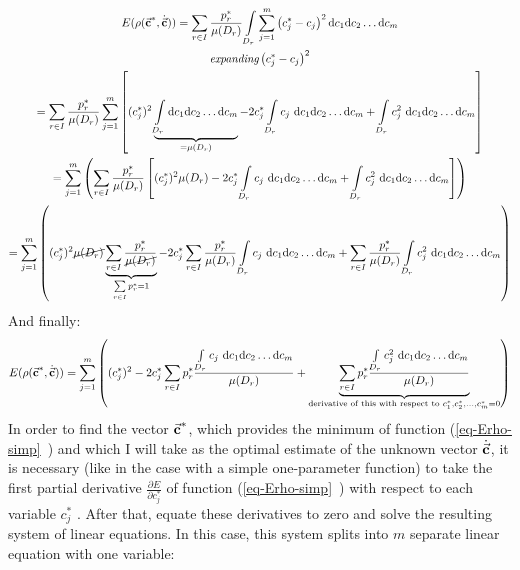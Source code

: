 \begin{gather}
\nonumber
E(\rho(\vec{\textbf{c}}^{*},\dot{\vec{\textbf{c}}}))=\sum\limits_{r \in I} \frac{p_{r}^{*}}{\mu(D_{r})} \int\limits_{D_{r}}\sum\limits_{j=1}^{m} \left( c_{j}^{*}-c_{j} \right)^{2}\mathrm{d}c_{1}\mathrm{d}c_{2}\dots \mathrm{d}c_{m}\\
\nonumber
\textit{expanding} \left( c_{j}^{*}-c_{j} \right)^{2} \\
\nonumber
=\sum\limits_{r \in I} \frac{p_{r}^{*}}{\mu(D_{r})} \sum\limits_{j=1}^{m} \left[ (c_{j}^{*})^{2} \underbrace{\int\limits_{D_{r}} \mathrm{d}c_{1}\mathrm{d}c_{2}\dots \mathrm{d}c_{m}}_{{=\mu(D_{r})}} - 2c_{j}^{*} \int\limits_{D_{r}} c_{j} \  \mathrm{d}c_{1}\mathrm{d}c_{2}\dots \mathrm{d}c_{m} + \int\limits_{D_{r}} c_{j}^{2} \  \mathrm{d}c_{1}\mathrm{d}c_{2}\dots \mathrm{d}c_{m}\right]\\
\nonumber
=\sum\limits_{j=1}^{m} \left( \sum\limits_{r \in I} \frac{p_{r}^{*}}{\mu(D_{r})} \left[ (c_{j}^{*})^{2} \mu(D_{r})-2c_{j}^{*} \int\limits_{D_{r}} c_{j} \  \mathrm{d}c_{1}\mathrm{d}c_{2}\dots \mathrm{d}c_{m} + \int\limits_{D_{r}} c_{j}^{2} \  \mathrm{d}c_{1}\mathrm{d}c_{2}\dots \mathrm{d}c_{m} \right] \right)\\ 
=\sum\limits_{j=1}^{m} \left( (c_{j}^{*})^{2} \cancel{\mu(D_{r})} \underbrace{\sum\limits_{r \in I} \frac{p_{r}^{*}}{\cancel{\mu(D_{r})}}}_{\sum\limits_{r \in I}p_{r}^{*} = 1} - 2c_{j}^{*} \sum\limits_{r \in I}\frac{p_{r}^{*}}{\mu(D_{r})} \int\limits_{D_{r}} c_{j} \  \mathrm{d}c_{1}\mathrm{d}c_{2}\dots \mathrm{d}c_{m} + \sum\limits_{r \in I}\frac{p_{r}^{*}}{\mu(D_{r})} \int\limits_{D_{r}} c_{j}^{2} \  \mathrm{d}c_{1}\mathrm{d}c_{2}\dots \mathrm{d}c_{m} \right)
\end{gather}
And finally:
\begin{equation}
E(\rho(\vec{\textbf{c}}^{*},\dot{\vec{\textbf{c}}}))= \sum\limits_{j=1}^{m} \left( (c_{j}^{*})^{2} - 2c_{j}^{*} \sum\limits_{r \in I} p_{r}^{*} \frac{\int\limits_{D_{r}} c_{j} \  \mathrm{d}c_{1}\mathrm{d}c_{2}\dots \mathrm{d}c_{m}}{\mu(D_{r})} + \underbrace{\sum\limits_{r \in I} p_{r}^{*} \frac{\int\limits_{D_{r}} c_{j}^{2} \  \mathrm{d}c_{1}\mathrm{d}c_{2}\dots \mathrm{d}c_{m}}{\mu(D_{r})}}_{\text{derivative of this with respect to } c_{1}^{*}, c_{2}^{*},\dots,c_{m}^{*} = 0} \right) \label{eq-Erho-simp}
\end{equation}
In order to find the vector $\vec{\textbf{c}}^{*}$, which provides the minimum of function (\vref{eq-Erho-simp}~) and which I will take as the optimal estimate of the unknown vector $\dot{\vec{\textbf{c}}}$, it is necessary (like in the case with a simple one-parameter function) to take the first partial derivative $\frac{\partial E}{\partial c_{j}^{*}}$ of function (\vref{eq-Erho-simp}~) with respect to each variable $c_{j}^{*}$  \cite{stewart_2008_deriv}. After that, equate these derivatives to zero and solve the resulting system of linear equations. In this case, this system splits into $m$ separate linear equation with one variable:
